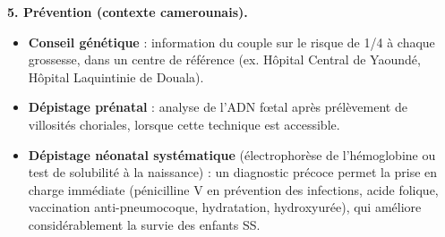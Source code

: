 \documentclass[11pt]{article}
\begin{document}
\begin{corrige}
\textbf{5. Prévention (contexte camerounais).}
\begin{itemize}
    \item \textbf{Conseil génétique} : information du couple sur le risque de 1/4 à chaque grossesse, dans un centre de référence (ex. Hôpital Central de Yaoundé, Hôpital Laquintinie de Douala).
    \item \textbf{Dépistage prénatal} : analyse de l'ADN fœtal après prélèvement de villosités choriales, lorsque cette technique est accessible.
    \item \textbf{Dépistage néonatal systématique} (électrophorèse de l'hémoglobine ou test de solubilité à la naissance) : un diagnostic précoce permet la prise en charge immédiate (pénicilline V en prévention des infections, acide folique, vaccination anti-pneumocoque, hydratation, hydroxyurée), qui améliore considérablement la survie des enfants SS.
\end{itemize}
\end{corrige}
\end{document}
